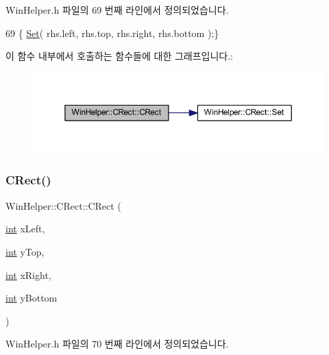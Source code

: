 Win\+Helper.\+h 파일의 69 번째 라인에서 정의되었습니다.


\begin{DoxyCode}
69 \{ \mbox{\hyperlink{class_win_helper_1_1_c_rect_a5cc306b936afd8a1fe8321a7846ad260}{Set}}( rhs.left, rhs.top, rhs.right, rhs.bottom );\}
\end{DoxyCode}
이 함수 내부에서 호출하는 함수들에 대한 그래프입니다.\+:
\nopagebreak
\begin{figure}[H]
\begin{center}
\leavevmode
\includegraphics[width=350pt]{class_win_helper_1_1_c_rect_aae968ffaab6da35e85e7fa0e8941aea7_cgraph}
\end{center}
\end{figure}
\mbox{\label{class_win_helper_1_1_c_rect_a3253ffe9a6b650c58100509712805d30}} 
\subsubsection{\texorpdfstring{C\+Rect()}{CRect()}\hspace{0.1cm}{\footnotesize\ttfamily [3/3]}}
{\footnotesize\ttfamily Win\+Helper\+::\+C\+Rect\+::\+C\+Rect (\begin{DoxyParamCaption}\item[{\mbox{\hyperlink{_util_8cpp_a0ef32aa8672df19503a49fab2d0c8071}{int}}}]{x\+Left,  }\item[{\mbox{\hyperlink{_util_8cpp_a0ef32aa8672df19503a49fab2d0c8071}{int}}}]{y\+Top,  }\item[{\mbox{\hyperlink{_util_8cpp_a0ef32aa8672df19503a49fab2d0c8071}{int}}}]{x\+Right,  }\item[{\mbox{\hyperlink{_util_8cpp_a0ef32aa8672df19503a49fab2d0c8071}{int}}}]{y\+Bottom }\end{DoxyParamCaption})\hspace{0.3cm}{\ttfamily [inline]}}



Win\+Helper.\+h 파일의 70 번째 라인에서 정의되었습니다.


